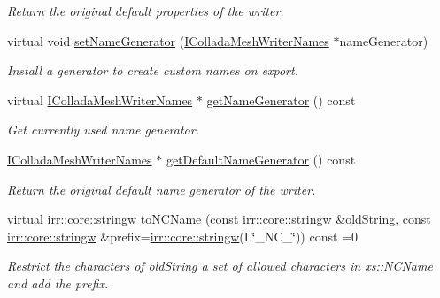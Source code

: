 \begin{DoxyCompactItemize}
\begin{DoxyCompactList}\small\item\em Return the original default properties of the writer. \end{DoxyCompactList}\item 
\mbox{\label{classirr_1_1scene_1_1IColladaMeshWriter_a7e48b43c91133e482e76da54849ef153}} 
virtual void \hyperlink{classirr_1_1scene_1_1IColladaMeshWriter_a7e48b43c91133e482e76da54849ef153}{set\+Name\+Generator} (\hyperlink{classirr_1_1scene_1_1IColladaMeshWriterNames}{I\+Collada\+Mesh\+Writer\+Names} $\ast$name\+Generator)
\begin{DoxyCompactList}\small\item\em Install a generator to create custom names on export. \end{DoxyCompactList}\item 
\mbox{\label{classirr_1_1scene_1_1IColladaMeshWriter_ad519f6ce64dcf1013b6fe0b9aaa67b40}} 
virtual \hyperlink{classirr_1_1scene_1_1IColladaMeshWriterNames}{I\+Collada\+Mesh\+Writer\+Names} $\ast$ \hyperlink{classirr_1_1scene_1_1IColladaMeshWriter_ad519f6ce64dcf1013b6fe0b9aaa67b40}{get\+Name\+Generator} () const
\begin{DoxyCompactList}\small\item\em Get currently used name generator. \end{DoxyCompactList}\item 
\hyperlink{classirr_1_1scene_1_1IColladaMeshWriterNames}{I\+Collada\+Mesh\+Writer\+Names} $\ast$ \hyperlink{classirr_1_1scene_1_1IColladaMeshWriter_acd10fcf2458271d59cf76284613288f6}{get\+Default\+Name\+Generator} () const
\begin{DoxyCompactList}\small\item\em Return the original default name generator of the writer. \end{DoxyCompactList}\item 
virtual \hyperlink{namespaceirr_1_1core_aef83fafbb1b36fcce44c07c9be23a7f2}{irr\+::core\+::stringw} \hyperlink{classirr_1_1scene_1_1IColladaMeshWriter_ac9c48beab095aa6f4cb4f696bb2ecd45}{to\+N\+C\+Name} (const \hyperlink{namespaceirr_1_1core_aef83fafbb1b36fcce44c07c9be23a7f2}{irr\+::core\+::stringw} \&old\+String, const \hyperlink{namespaceirr_1_1core_aef83fafbb1b36fcce44c07c9be23a7f2}{irr\+::core\+::stringw} \&prefix=\hyperlink{namespaceirr_1_1core_aef83fafbb1b36fcce44c07c9be23a7f2}{irr\+::core\+::stringw}(L\char`\"{}\+\_\+\+N\+C\+\_\+\char`\"{})) const =0
\begin{DoxyCompactList}\small\item\em Restrict the characters of old\+String a set of allowed characters in xs\+::\+N\+C\+Name and add the prefix. \end{DoxyCompactList}\end{DoxyCompactItemize}

